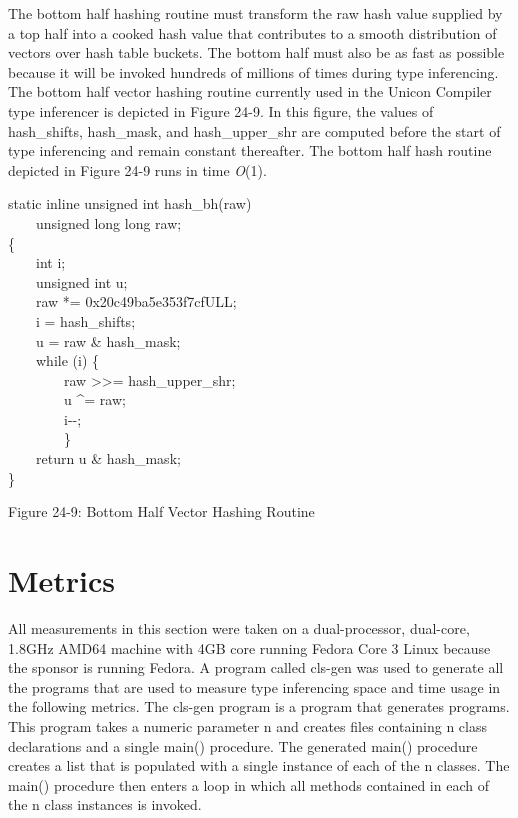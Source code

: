 {The bottom half hashing routine must transform the raw hash value
supplied by a top half into a cooked hash value that contributes to a
smooth distribution of vectors over hash table buckets. The bottom
half must also be as fast as possible because it will be invoked
hundreds of millions of times during type inferencing. The bottom half
vector hashing routine currently used in the Unicon Compiler type
inferencer is depicted in Figure 24-9. In this figure, the values of
{\textsf{hash\_shifts}}, {\textsf{hash\_mask}}, and
{\textsf{hash\_upper\_shr}} are computed before the start of type
inferencing and remain constant thereafter. The bottom half hash
routine depicted in Figure 24-9 runs in time {\textit{O}}(1).

\bigskip

\begin{iconcode}
static inline unsigned int hash\_bh(raw) \\
\ \ \ \ unsigned long long raw; \\
\{ \\
\ \ \ \ int i; \\
\ \ \ \ unsigned int u; \\
\ \ \ \ raw *= 0x20c49ba5e353f7cfULL; \\
\ \ \ \ i = hash\_shifts; \\
\ \ \ \ u = raw \& hash\_mask; \\
\ \ \ \ while (i) \{ \\
\ \ \ \ \ \ \ \ raw {\textgreater}{\textgreater}= hash\_upper\_shr; \\
\ \ \ \ \ \ \ \ u \^{}= raw; \\
\ \ \ \ \ \ \ \ i-{}-; \\
\ \ \ \ \ \ \ \ \} \\
\ \ \ \ return u \& hash\_mask; \\
\}
\end{iconcode}

{\centering
Figure 24-9: Bottom Half Vector Hashing Routine
\par}

\section{Metrics}

All measurements in this section were taken on a dual-processor,
dual-core, 1.8GHz AMD64 machine with 4GB core running Fedora Core 3
Linux because the sponsor is running Fedora. A program called
{\textsf{cls-gen}} was used to generate all the programs that are used
to measure type inferencing space and time usage in the following
metrics. The {\textsf{cls-gen}} program is a program that generates
programs.  This program takes a numeric parameter n and creates files
containing n class declarations and a single {\textsf{main()}}
procedure. The generated {\textsf{main()}} procedure creates a list
that is populated with a single instance of each of the n classes. The
{\textsf{main()}} procedure then enters a loop in which all methods
contained in each of the n class instances is invoked.

}
